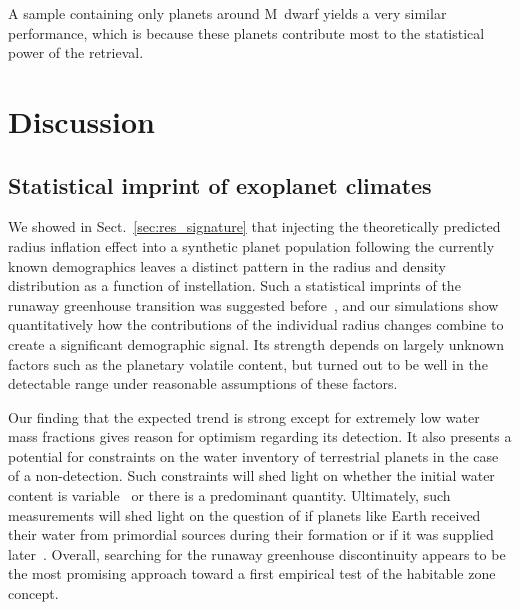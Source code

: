 \documentclass[twocolumn]{aastex631}
\begin{document}
A sample containing only planets around M~dwarf yields a very similar performance, which is because these planets contribute most to the statistical power of the retrieval.



\section{Discussion}\label{sec:discussion}

\subsection{Statistical imprint of exoplanet climates}
We showed in Sect.~\ref{sec:res_signature} that injecting the theoretically predicted radius inflation effect into a synthetic planet population following the currently known demographics leaves a distinct pattern in the radius and density distribution as a function of instellation.
Such a statistical imprints of the runaway greenhouse transition was suggested before~\citep{Turbet2019}, and our simulations show quantitatively how the contributions of the individual radius changes combine to create a significant demographic signal.
Its strength depends on largely unknown factors such as the planetary volatile content, but turned out to be well in the detectable range under reasonable assumptions of these factors.

Our finding that the expected trend is strong except for extremely low water mass fractions gives reason for optimism regarding its detection.
It also presents a potential for constraints on the water inventory of terrestrial planets in the case of a non-detection.
Such constraints will shed light on whether the initial water content is variable~\citep{Lichtenberg2019} or there is a predominant quantity.
Ultimately, such measurements will shed light on the question of if planets like Earth received their water from primordial sources during their formation or if it was supplied later~\citep[e.g.,][]{Raymond2004}.
Overall, searching for the runaway greenhouse discontinuity appears to be the most promising approach toward a first empirical test of the habitable zone concept.
\end{document}
